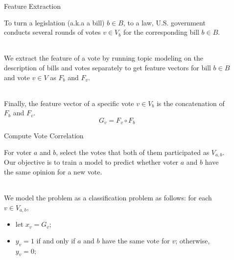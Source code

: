 \documentclass[final]{beamer}
\newlength{\sepwid}
\newlength{\onecolwid}
\begin{document}
\begin{frame}[t]
\begin{columns}[t]
\begin{column}{\onecolwid}
\end{column} %

\begin{column}{\sepwid}\end{column} %

\begin{column}{\onecolwid} %


\begin{block}{Feature Extraction}

    To turn a legislation (a.k.a a bill) $b \in B$, to a law, U.S. government conducts several rounds of votes $v \in V_b$ for the corresponding bill $b \in B$. 
    
    \quad \\
    
    We extract the feature of a vote by running topic modeling on the description of bills and votes separately to get feature vectors for bill $b \in B$ and vote $v \in V$ as $F_b$ and $F_v$.
    
    \quad \\
    
    Finally, the feature vector of a specific vote $v \in V_b$ is the concatenation of $F_b$ and $F_v$.
    \[
        G_v = F_v \circ F_b
    \]
    
\end{block}


\begin{block}{Compute Vote Correlation}

    For voter $a$ and $b$, select the votes that both of them participated as $V_{a,b}$. Our objective is to train a model to predict whether voter $a$ and $b$ have the same opinion for a new vote. 
    
    \quad \\
    
    We model the problem as a classification problem as follows: for each $v \in V_{a,b}$, 
    \begin{itemize}
        \item let $x_v = G_v$;
        \item $y_v = 1$ if and only if $a$ and $b$ have the same vote for $v$; otherwise, $y_v = 0$;    
    \end{itemize}
    

\end{block}
\end{column}
\end{columns}
\end{frame}
\end{document}
